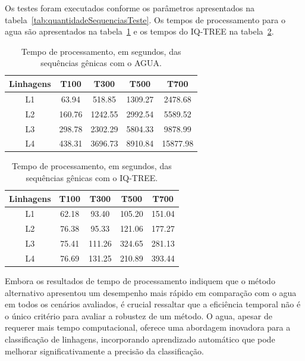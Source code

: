 Os testes foram executados conforme os parâmetros apresentados na tabela~\ref{tab:quantidadeSequenciasTeste}. Os tempos de processamento para o \gls{agua} são apresentados na tabela~\ref{tab:tempoProcessamentoAgua} e os tempos do IQ-TREE na tabela~\ref{tab:tempoProcessamentoIqtree}.

\begin{table}[htb]
  \caption{Tempo de processamento, em segundos, das sequências gênicas com o AGUA.}
  \begin{center}
    \begin{tabular}{c|c|c|c|c}
      \hline
      Linhagens & T100   & T300    & T500    & T700     \\
      \hline
      L1        & 63.94  & 518.85  & 1309.27 & 2478.68  \\
      L2        & 160.76 & 1242.55 & 2992.54 & 5589.52  \\
      L3        & 298.78 & 2302.29 & 5804.33 & 9878.99  \\
      L4        & 438.31 & 3696.73 & 8910.84 & 15877.98 \\
      \hline
    \end{tabular}
  \end{center}
  \label{tab:tempoProcessamentoAgua}
\end{table}

\begin{table}[htb]
  \caption{Tempo de processamento, em segundos, das sequências gênicas com o IQ-TREE.}
  \begin{center}
    \begin{tabular}{c|c|c|c|c}
      \hline
      Linhagens & T100  & T300   & T500   & T700   \\
      \hline
      L1        & 62.18 & 93.40  & 105.20 & 151.04 \\
      L2        & 76.38 & 95.33  & 121.06 & 177.27 \\
      L3        & 75.41 & 111.26 & 324.65 & 281.13 \\
      L4        & 76.69 & 131.25 & 210.89 & 393.44 \\
      \hline
    \end{tabular}
  \end{center}
  \label{tab:tempoProcessamentoIqtree}
\end{table}

Embora os resultados de tempo de processamento indiquem que o método alternativo apresentou um desempenho mais rápido em comparação com o \gls{agua} em todos os cenários avaliados, é crucial ressaltar que a eficiência temporal não é o único critério para avaliar a robustez de um método. O \gls{agua}, apesar de requerer mais tempo computacional, oferece uma abordagem inovadora para a classificação de linhagens, incorporando aprendizado automático que pode melhorar significativamente a precisão da classificação.

